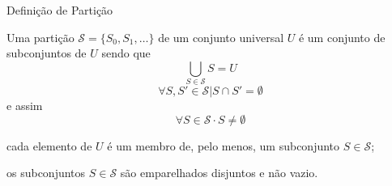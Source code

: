    \begin{frame}{Definição de Partição}

      Uma partição $ \mathcal{S} = \{S_0, S_1, \dots\} $ de um conjunto universal $ U $ é um conjunto de subconjuntos de $ U $ sendo que
         \begin{equation}
            \bigcup_{S \in \mathcal{S}} S = U \label{eq:part_form_1}
         \end{equation}
         \begin{equation}
            \forall S, S' \in \mathcal{S} | S \cap S' = \emptyset \label{eq:part_form_2}
         \end{equation}
         e assim
         \begin{equation}
            \forall S \in \mathcal{S} \cdot S \neq \emptyset \label{eq:part_form_3}
         \end{equation}

            \bigskip

         \begin{description}
         \setlength{\itemsep}{0.6em}
            \item [Equ. \ref{eq:part_form_1}:] cada elemento de $ U $ é um membro de, pelo menos, um subconjunto $ S \in \mathcal{S} $;

            \item [Equ. \ref{eq:part_form_2} e \ref{eq:part_form_3}:] os subconjuntos $ S \in \mathcal{S} $ são emparelhados disjuntos e não vazio.

         \end{description}

   \end{frame}


